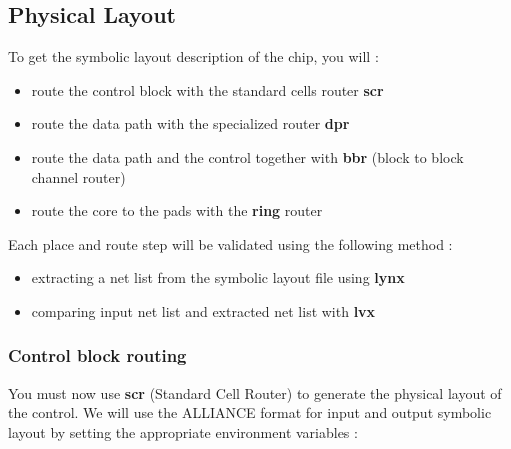 
	\subsection{Physical Layout}



To get the symbolic layout description of the chip, you will :

\begin{itemize}
\item
route the control block with the standard cells router {\bf scr}
\item
route the data path with  the specialized router {\bf dpr}
\item
route the data path and the control together with {\bf bbr} (block to
block channel router)
\item
route the core to the pads with the {\bf ring} router
\end{itemize}

Each place and route step will be validated using the following method :

\begin{itemize}
\item
extracting a net list from the symbolic layout file using {\bf lynx}
\item
comparing input net list and extracted net list with {\bf lvx}
\end{itemize}



    		\subsubsection{Control block routing}


You must now use {\bf scr} (Standard Cell Router) to generate the physical layout
of the control.
We will use the ALLIANCE format for input and output symbolic layout by setting the appropriate environment variables :



